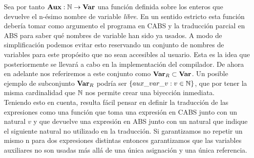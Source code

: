 Sea por tanto $\textbf{Aux}: \mathbb{N} \rightarrow \textbf{Var}$ una función definida sobre los enteros que devuelve el n-ésimo nombre de variable {\it libre}. En un sentido estricto esta función debería tomar como argumento el programa en CABS y la traducción parcial en ABS para saber qué nombres de variable han sido ya usados. A modo de simplificación podemos evitar esto reservando un conjunto de nombres de variables para este propósito que no sean accesibles al usuario. Esta es la idea que posteriormente se llevará a cabo en la implementación del compilador. De ahora en adelante nos referiremos a este conjunto como $\textbf{Var}_R \subset \textbf{Var}$. Un posible ejemplo de subconjunto $\textbf{Var}_R$ podría ser $\{aux\_var\_v: v \in \mathbb{N}\}$, que por tener la misma cardinalidad que $\mathbb{N}$ nos permite crear una biyección inmediata.\\

Teniendo esto en cuenta, resulta fácil pensar en definir la traducción de las expresiones como una función que toma una expresión en CABS junto con un natural $v$ y que devuelve una expresión en ABS junto con un natural que indique el siguiente natural no utilizado en la traducción. Si garantizamos no repetir un mismo n para dos expresiones distintas entonces garantizamos que las variables auxiliares no son usadas más allá de una única asignación y una única referencia.\\

